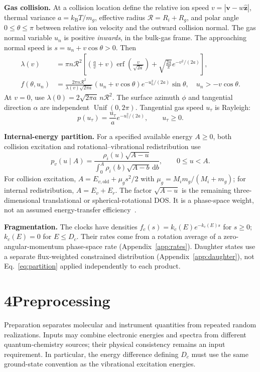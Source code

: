 \documentclass[10pt,a4paper]{article}
\newcommand{\dd}{\,\mathrm d}
\newcommand{\kb}{k_{\mathrm B}}
\newcommand{\Unif}{\operatorname{Unif}}
\newcommand{\erf}{\operatorname{erf}}
\newcommand{\overview}[2]{\section*{#1\quad #2}\addcontentsline{toc}{section}{#1 #2}}
\begin{document}
\textbf{Gas collision.} At a collision location define the relative ion speed
$v=|\mathbf v-w\hat{\mathbf z}|$, thermal variance $a=\kb T/m_g$,
effective radius $\mathcal R=R_i+R_g$, and polar angle $0\leq\theta\leq\pi$
between relative ion velocity and the outward collision normal. The gas
normal variable $u_n$ is positive \emph{inwards}, in the bulk-gas frame.
The approaching normal speed is $s=u_n+v\cos\theta>0$. Then~\cite{si}
\begin{align}
 \lambda(v)&=\pi n\mathcal R^2\left[
 \left(\frac a v+v\right)\erf\!\left(\frac v{\sqrt{2a}}\right)
 +\sqrt{\frac{2a}{\pi}}e^{-v^2/(2a)}\right],\label{eq:lambda}\\
 f(\theta,u_n)&=\frac{2\pi n\mathcal R^2}{\lambda(v)\sqrt{2\pi a}}
 (u_n+v\cos\theta)e^{-u_n^2/(2a)}\sin\theta,
 \quad u_n>-v\cos\theta.\label{eq:gasjoint}
\end{align}
At $v=0$, use $\lambda(0)=2\sqrt{2\pi a}\,n\mathcal R^2$.
The surface azimuth $\phi$ and tangential direction $\alpha$ are independent
$\Unif(0,2\pi)$. Tangential gas speed $u_\tau$ is Rayleigh:
\[
 p(u_\tau)=\frac{u_\tau}{a}e^{-u_\tau^2/(2a)},\qquad u_\tau\geq0.
\]

\textbf{Internal-energy partition.} For a specified available energy $A\geq0$,
both collision excitation and rotational--vibrational redistribution use
\begin{equation}
 p_v(u\mid A)=\frac{\rho_i(u)\sqrt{A-u}}
 {\int_0^A\rho_i(b)\sqrt{A-b}\dd b},\qquad0\leq u<A.\label{eq:partition}
\end{equation}
For collision excitation, $A=E_{v,\mathrm{old}}+\mu_gs^2/2$ with
$\mu_g=M_im_g/(M_i+m_g)$; for internal redistribution, $A=E_v+E_r$.
The factor $\sqrt{A-u}$ is the remaining three-dimensional translational
or spherical-rotational DOS. It is a phase-space weight, not an assumed
energy-transfer efficiency~\cite{zapadinsky,si}.

\textbf{Fragmentation.} The clocks have densities
$f_c(s)=k_c(E)e^{-k_c(E)s}$ for $s\geq0$; $k_c(E)=0$ for $E\leq D_c$.
Their rates come from a rotation average of a zero-angular-momentum
phase-space rate (Appendix~\ref{app:rates}). Daughter states use a separate
flux-weighted constrained distribution (Appendix~\ref{app:daughter}), not
Eq.~\eqref{eq:partition} applied independently to each product.

\clearpage
\overview{4}{Preprocessing}
Preparation separates molecular and instrument quantities from repeated random
realizations. Inputs may combine electronic energies and spectra from different
quantum-chemistry sources; their physical consistency remains an input
requirement. In particular, the energy difference defining $D_c$ must use the
same ground-state convention as the vibrational excitation energies.
\end{document}
